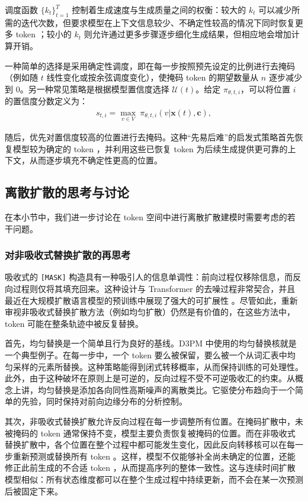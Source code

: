 \documentclass[UTF8,a4paper,zihao=-4,oneside,openany]{ctexbook}
\begin{document}
\noindent 调度函数 $\{k_t\}_{t=1}^T$ 控制着生成速度与生成质量之间的权衡：较大的 $k_t$ 可以减少所需的迭代次数，但要求模型在上下文信息较少、不确定性较高的情况下同时恢复更多 token ；较小的 $k_t$ 则允许通过更多步骤逐步细化生成结果，但相应地会增加计算开销。

一种简单的选择是采用确定性调度，即在每一步按照预先设定的比例进行去掩码（例如随 $t$ 线性变化或按余弦调度变化），使掩码 token 的期望数量从 $n$ 逐步减少到 $0$。另一种常见策略是根据模型置信度选择 $\mathcal{U}(t)$。给定 $\pi_{\theta,t,i}$，可以将位置 $i$ 的置信度分数定义为：
\begin{eqnarray}
s_{t,i} = \max_{v\in V}\ \pi_{\theta,t,i}\!\left(v| \mathbf{x}(t),\mathbf{c}\right),
\end{eqnarray}

\noindent 随后，优先对置信度较高的位置进行去掩码。这种“先易后难”的启发式策略首先恢复模型较为确定的 token ，并利用这些已恢复 token 为后续生成提供更可靠的上下文，从而逐步填充不确定性更高的位置。

\subsection{离散扩散的思考与讨论}

在本小节中，我们进一步讨论在 token 空间中进行离散扩散建模时需要考虑的若干问题。

\subsubsection{对非吸收式替换扩散的再思考}
\label{sec:rethink-non-absorbing}

吸收式的 \texttt{[MASK]} 构造具有一种吸引人的信息单调性：前向过程仅移除信息，而反向过程则仅将其填充回来。这种设计与 Transformer 的去噪过程非常契合，并且最近在大规模扩散语言模型的预训练中展现了强大的可扩展性 \citep{sahoo-etal:2024simple,nie-etal:2025large}。尽管如此，重新审视非吸收式替换扩散方法（例如均匀扩散）仍然是有价值的，在这些方法中， token 可能在整条轨迹中被反复替换。

首先，均匀替换是一个简单且行为良好的基线。D3PM 中使用的均匀替换核就是一个典型例子。在每一步中，一个 token 要么被保留，要么被一个从词汇表中均匀采样的元素所替换。这种策略能得到闭式转移概率，从而保持训练的可处理性。此外，由于这种破坏在原则上是可逆的，反向过程不受不可逆吸收汇的约束。从概念上讲，均匀替换是添加各向同性高斯噪声的离散类比。它驱使分布趋向于一个简单的先验，同时保持对前向边缘分布的分析控制。

其次，非吸收式替换扩散允许反向过程在每一步调整所有位置。在掩码扩散中，未被掩码的 token 通常保持不变，模型主要负责恢复被掩码的位置。而在非吸收式替换扩散中，各个位置在整个过程中都可能发生变化，因此反向转移核可以在每一步重新预测或替换所有 token 。这样，模型不仅能够补全尚未确定的位置，还能修正此前生成的不合适 token ，从而提高序列的整体一致性。这与连续时间扩散模型相似：所有状态维度都可以在整个生成过程中持续更新，而不会在某一次预测后被固定下来。
\end{document}
